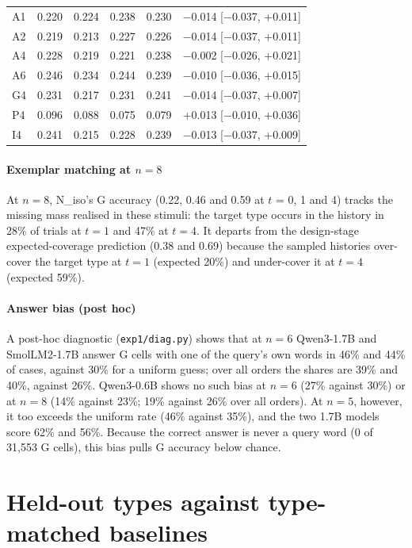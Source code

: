 \documentclass[11pt]{article}
\begin{document}
\begin{table}[tbp]
\begin{tabular}{@{}llllll@{}}
A1 & 0.220 & 0.224 & 0.238 & 0.230 & $-$0.014 [$-$0.037, +0.011] \\
A2 & 0.219 & 0.213 & 0.227 & 0.226 & $-$0.014 [$-$0.037, +0.011] \\
A4 & 0.228 & 0.219 & 0.221 & 0.238 & $-$0.002 [$-$0.026, +0.021] \\
A6 & 0.246 & 0.234 & 0.244 & 0.239 & $-$0.010 [$-$0.036, +0.015] \\
G4 & 0.231 & 0.217 & 0.231 & 0.241 & $-$0.014 [$-$0.037, +0.007] \\
P4 & 0.096 & 0.088 & 0.075 & 0.079 & +0.013 [$-$0.010, +0.036] \\
I4 & 0.241 & 0.215 & 0.228 & 0.239 & $-$0.013 [$-$0.037, +0.009] \\
\bottomrule
\end{tabular}
\end{table}

\paragraph{Exemplar matching at $n = 8$}

At $n = 8$, N\_iso's G accuracy (0.22, 0.46 and 0.59 at $t$ = 0, 1 and 4) tracks the missing mass realised in these stimuli: the target type occurs in the history in 28\% of trials at $t = 1$ and 47\% at $t = 4$. It departs from the design-stage expected-coverage prediction (0.38 and 0.69) because the sampled histories over-cover the target type at $t = 1$ (expected 20\%) and under-cover it at $t = 4$ (expected 59\%).

\paragraph{Answer bias (post hoc)}

A post-hoc diagnostic (\texttt{exp1/\allowbreak{}diag.py}) shows that at $n = 6$ Qwen3-1.7B and SmolLM2-1.7B answer G cells with one of the query's own words in 46\% and 44\% of cases, against 30\% for a uniform guess; over all orders the shares are 39\% and 40\%, against 26\%. Qwen3-0.6B shows no such bias at $n = 6$ (27\% against 30\%) or at $n = 8$ (14\% against 23\%; 19\% against 26\% over all orders). At $n = 5$, however, it too exceeds the uniform rate (46\% against 35\%), and the two 1.7B models score 62\% and 56\%. Because the correct answer is never a query word (0 of 31,553 G cells), this bias pulls G accuracy below chance.

\section{Held-out types against type-matched baselines}\label{app:typematched}
\end{document}
